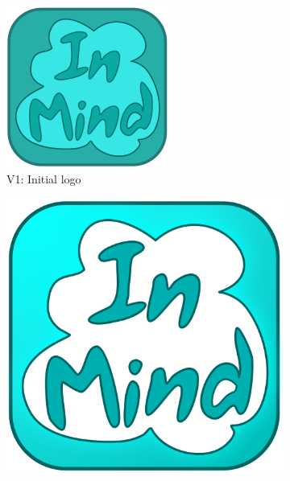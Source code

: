   \begin{figure}
    \caption[Evolution of the InMind logo]
    {\textbf{Evolution of the InMind logo} --
    On feedback from users, the icon evolved to better fit what users expect from
    mobile applications.
    }
    \centering
    \begin{subfigure}[b]{0.25\textwidth}
      \includegraphics[width=\textwidth]{inmind_logo0.png}
      \caption{V1: Initial logo}
    \end{subfigure}
    \begin{subfigure}[b]{0.25\textwidth}
      \includegraphics[width=\textwidth]{inmind_logo1.png}

\end{subfigure}
\end{figure}
